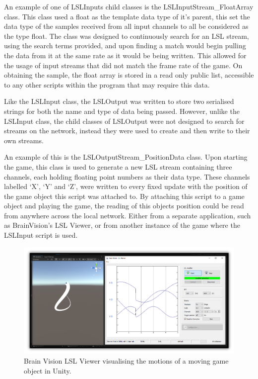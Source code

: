 \documentclass[11pt, a4paper]{article}
\begin{document}
\hfill

An example of one of LSLInputs child classes is the LSLInputStream\_FloatArray class. This class used a float as the template data type of it's parent, this set the data type of the samples received from all input channels to all be considered as the type float. The class was designed to continuously search for an LSL stream, using the search terms provided, and upon finding a match would begin pulling the data from it at the same rate as it would be being written. This allowed for the usage of input streams that did not match the frame rate of the game. On obtaining the sample, the float array is stored in a read only public list, accessible to any other scripts within the program that may require this data.

\hfill

Like the LSLInput class, the LSLOutput was written to store two serialised strings for both the name and type of data being passed. However, unlike the LSLInput class, the child classes of LSLOutput were not designed to search for streams on the network, instead they were used to create and then write to their own streams. 

\hfill  

An example of this is the LSLOutputStream\_PositionData class. Upon starting the game, this class is used to generate a new LSL stream containing three channels, each holding floating point numbers as their data type. These channels labelled `X', `Y' and `Z', were written to every fixed update with the position of the game object this script was attached to. By attaching this script to a game object and playing the game, the reading of this objects position could be read from anywhere across the local network. Either from a separate application, such as BrainVision's LSL Viewer, or from another instance of the game where the LSLInput script is used.


\begin{figure}[H]
	\centering
	\includegraphics[width = 0.9 \linewidth] {[ Figures ]/Brain Vision LSL Viewer.png}
	\captionsetup{font = small, labelfont = small, width=.8\linewidth}
	\caption{Brain Vision LSL Viewer visualising the motions of a moving game object in Unity.}
	\label{fig:LSL_output_position}
\end{figure}
\end{document}
